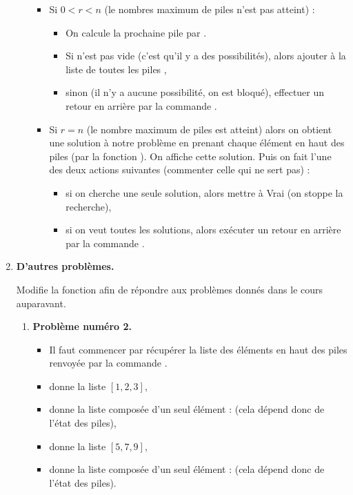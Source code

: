 \documentclass[11pt,class=report,crop=false]{standalone}
\begin{document}
\begin{activite}
\begin{enumerate}
\begin{algorithme}
\begin{itemize}
\begin{itemize}
     \item Si $0 < r < n$ (le nombres maximum de piles n'est pas atteint) :
     \begin{itemize}
       \item On calcule la prochaine pile  par .
       \item Si  n'est pas vide (c'est qu'il y a des possibilités), alors ajouter   à la liste de toutes les piles ,      
       \item sinon (il n'y a aucune possibilité, on est bloqué), effectuer un retour en arrière par la commande . 
     \end{itemize}      
     
     \item Si $r=n$ (le nombre maximum de piles est atteint) alors on obtient une solution à notre problème en prenant chaque élément en haut des piles (par la fonction ). On affiche cette solution. Puis on fait l'une des deux actions suivantes (commenter celle qui ne  sert pas) :
     \begin{itemize}
       \item si on cherche une seule solution, alors mettre  à \og{}Vrai\fg{}
       (on stoppe la recherche),
       \item si on veut toutes les solutions, alors exécuter un retour en arrière par la commande .        
     \end{itemize}      
     
        
  \end{itemize}   
      
 \end{itemize}  
 \end{algorithme}  
  
  
  \item \textbf{D'autres problèmes.}
  
  Modifie la fonction  afin de répondre aux problèmes donnés dans le cours auparavant.
  \begin{enumerate}
    \item \textbf{Problème numéro 2.}
    \begin{itemize}
      \item Il faut commencer par récupérer la liste des éléments en haut des piles renvoyée par la commande .
       \item {} donne la liste $[1,2,3]$,
       \item {} donne la liste composée d'un seul élément : \ci{[2*haut[0]]} (cela dépend donc de l'état des piles),
       \item {} donne la liste $[5,7,9]$,
       \item {} donne la liste composée d'un seul élément : \ci{[haut[2]]} (cela dépend donc de l'état des piles).
      \end{itemize}
                  

\end{enumerate}
\end{enumerate}
\end{activite}
\end{document}
